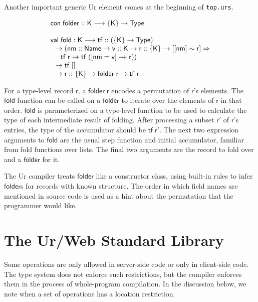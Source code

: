 \documentclass{article}
\newcommand{\mt}[1]{\mathsf{#1}}
\newcommand{\rc}{+ \hspace{-.075in} + \;}
\begin{document}
Another important generic Ur element comes at the beginning of \texttt{top.urs}.

$$\begin{array}{l}
  \mt{con} \; \mt{folder} :: \mt{K} \longrightarrow \{\mt{K}\} \to \mt{Type} \\
  \\
  \mt{val} \; \mt{fold} : \mt{K} \longrightarrow \mt{tf} :: (\{\mt{K}\} \to \mt{Type}) \\
  \hspace{.1in} \to (\mt{nm} :: \mt{Name} \to \mt{v} :: \mt{K} \to \mt{r} :: \{\mt{K}\} \to [[\mt{nm}] \sim \mt{r}] \Rightarrow \\
  \hspace{.2in} \mt{tf} \; \mt{r} \to \mt{tf} \; ([\mt{nm} = \mt{v}] \rc \mt{r})) \\
  \hspace{.1in} \to \mt{tf} \; [] \\
  \hspace{.1in} \to \mt{r} :: \{\mt{K}\} \to \mt{folder} \; \mt{r} \to \mt{tf} \; \mt{r}
\end{array}$$

For a type-level record $\mt{r}$, a $\mt{folder} \; \mt{r}$ encodes a permutation of $\mt{r}$'s elements.  The $\mt{fold}$ function can be called on a $\mt{folder}$ to iterate over the elements of $\mt{r}$ in that order.  $\mt{fold}$ is parameterized on a type-level function to be used to calculate the type of each intermediate result of folding.  After processing a subset $\mt{r'}$ of $\mt{r}$'s entries, the type of the accumulator should be $\mt{tf} \; \mt{r'}$.  The next two expression arguments to $\mt{fold}$ are the usual step function and initial accumulator, familiar from fold functions over lists.  The final two arguments are the record to fold over and a $\mt{folder}$ for it.

The Ur compiler treats $\mt{folder}$ like a constructor class, using built-in rules to infer $\mt{folder}$s for records with known structure.  The order in which field names are mentioned in source code is used as a hint about the permutation that the programmer would like.


\section{The Ur/Web Standard Library}

Some operations are only allowed in server-side code or only in client-side code.  The type system does not enforce such restrictions, but the compiler enforces them in the process of whole-program compilation.  In the discussion below, we note when a set of operations has a location restriction.
\end{document}
